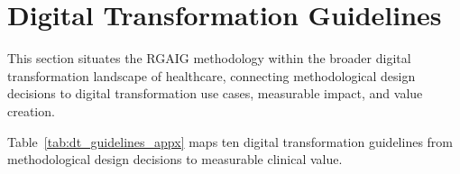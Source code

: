 \section{Digital Transformation Guidelines}
\label{sec:appx_digital_transformation}

This section situates the RGAIG methodology within the broader digital transformation landscape of healthcare, connecting methodological design decisions to digital transformation use cases, measurable impact, and value creation.

Table~\ref{tab:dt_guidelines_appx} maps ten digital transformation guidelines from methodological design decisions to measurable clinical value.

